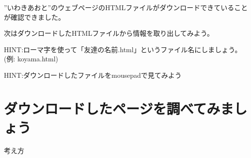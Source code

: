 \bigskip

”いわきあおと”のウェブページのHTMLファイルがダウンロードできていることが確認できました。

次はダウンロードしたHTMLファイルから情報を取り出してみよう。
\clearpage

\begin{tcolorbox}[title=\useOmetoi,breakable]\label{Q:port}
  \begin{enumerate}
    HINT:ローマ字を使って「友達の名前.html」というファイル名にしましょう。
    (例: koyama.html)
  \end{enumerate}
\end{tcolorbox}

\begin{tcolorbox}[title=\useOmetoi,breakable]\label{Q:HTML}
  \begin{enumerate}
    HINT:ダウンロードしたファイルをmousepadで見てみよう
  \end{enumerate}
\end{tcolorbox}




\clearpage

\section{ダウンロードしたページを調べてみましょう}\label{E:HTML}
考え方


